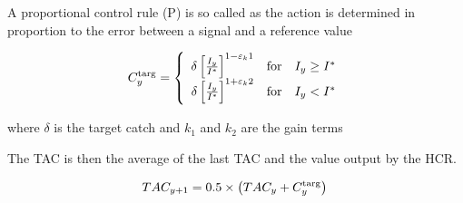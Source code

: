 A proportional control rule (P) is so called as the action is determined in proportion to the error between a signal and a reference value

\begin{equation} 
  C^{\rm targ}_y = 
  \left\{\begin{array}{rcl} 
      {\delta \left[\frac{I_{y}}{I^*}\right]^{1-\varepsilon_k1}} & \mbox{for} & I_{y}\geq I^*\\
      {\delta \left[\frac{I_{y}}{I^*}\right]^{1+\varepsilon_k2}} & \mbox{for} & I_{y}<I^* \\
        \end{array}
  \right.
\end{equation}

where $\delta$ is the target catch and $k_1$ and $k_2$ are the gain terms 

The TAC is then the average of the last TAC and the value output by the HCR. 

\begin{equation} 
     TAC_{y+1} = 0.5\times\left(TAC_y+C^{\rm targ}_y\right)\\
\end{equation}
